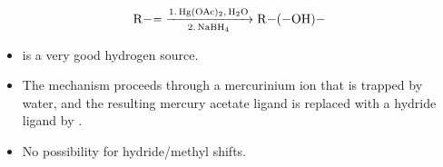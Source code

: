\documentclass[../notes.tex]{subfiles}
\begin{document}
\begin{itemize}
    \begin{equation*}
        \ce{R-= ->[1. Hg(OAc)2, H2O][2. NaBH4] R-(-OH)-}
    \end{equation*}
    \begin{itemize}
        \item {} is a very good hydrogen source.
        \item The mechanism proceeds through a mercurinium ion that is trapped by water, and the resulting mercury acetate ligand is replaced with a hydride ligand by .
        \item No possibility for hydride/methyl shifts.
    \end{itemize}
\end{itemize}
\end{document}
